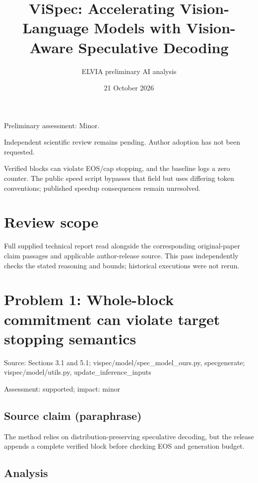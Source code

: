 \documentclass[11pt]{article}
\begin{document}
\title{ViSpec: Accelerating Vision-Language Models with Vision-Aware Speculative Decoding}

\author{ELVIA preliminary AI analysis}\date{21 October 2026}\maketitle

Preliminary assessment: Minor.\par

Independent scientific review remains pending. Author adoption has not been requested.

Verified blocks can violate EOS/cap stopping, and the baseline logs a zero counter. The public speed script bypasses that field but uses differing token conventions; published speedup consequences remain unresolved.

\section*{Review scope}

Full supplied technical report read alongside the corresponding original-paper claim passages and applicable author-release source. This pass independently checks the stated reasoning and bounds; historical executions were not rerun.

\section*{Problem 1: Whole-block commitment can violate target stopping semantics}

Source: Sections 3.1 and 5.1; vispec/model/spec\_model\_ours.py, specgenerate; vispec/model/utils.py, update\_inference\_inputs

Assessment: supported; impact: minor

\subsection*{Source claim (paraphrase)}

The method relies on distribution-preserving speculative decoding, but the release appends a complete verified block before checking EOS and generation budget.

\subsection*{Analysis}
\end{document}
